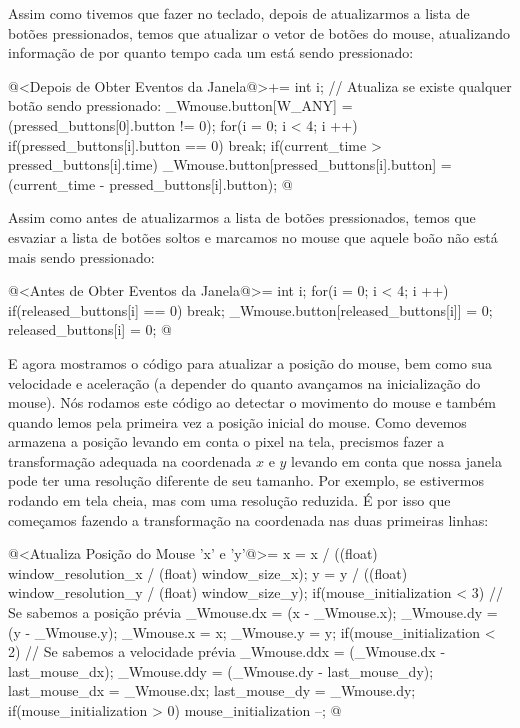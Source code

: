 Assim como tivemos que fazer no teclado, depois de atualizarmos a
lista de botões pressionados, temos que atualizar o vetor de botões do
mouse, atualizando informação de por quanto tempo cada um está sendo
pressionado:

\iniciocodigo
@<Depois de Obter Eventos da Janela@>+=
{
  int i;
  // Atualiza se existe qualquer botão sendo pressionado:
  _Wmouse.button[W_ANY] = (pressed_buttons[0].button != 0);
  for(i = 0; i < 4; i ++){
    if(pressed_buttons[i].button == 0)
      break;
    if(current_time > pressed_buttons[i].time)
      _Wmouse.button[pressed_buttons[i].button] =
        (current_time - pressed_buttons[i].button);
  }
}
@
\fimcodigo

Assim como antes de atualizarmos a lista de botões pressionados, temos
que esvaziar a lista de botões soltos e marcamos no mouse que aquele
boão não está mais sendo pressionado:

\iniciocodigo
@<Antes de Obter Eventos da Janela@>=
{
  int i;
  for(i = 0; i < 4; i ++){
    if(released_buttons[i] == 0)
      break;
    _Wmouse.button[released_buttons[i]] = 0;
    released_buttons[i] = 0;
  }
}
@
\fimcodigo

E agora mostramos o código para atualizar a posição do mouse, bem como
sua velocidade e aceleração (a depender do quanto avançamos na
inicialização do mouse). Nós rodamos este código ao detectar o
movimento do mouse e também quando lemos pela primeira vez a posição
inicial do mouse. Como devemos armazena a posição levando em conta o
pixel na tela, precismos fazer a transformação adequada na coordenada
$x$ e $y$ levando em conta que nossa janela pode ter uma resolução
diferente de seu tamanho. Por exemplo, se estivermos rodando em tela
cheia, mas com uma resolução reduzida. É por isso que começamos
fazendo a transformação na coordenada nas duas primeiras linhas:

\iniciocodigo
@<Atualiza Posição do Mouse 'x' e 'y'@>=
{
  x = x / ((float) window_resolution_x / (float) window_size_x);
  y = y / ((float) window_resolution_y / (float) window_size_y);
  if(mouse_initialization < 3){ // Se sabemos a posição prévia
    _Wmouse.dx = (x - _Wmouse.x);
    _Wmouse.dy = (y - _Wmouse.y);
  }
  _Wmouse.x = x;
  _Wmouse.y = y;
  if(mouse_initialization < 2){ // Se sabemos a velocidade prévia
    _Wmouse.ddx = (_Wmouse.dx - last_mouse_dx);
    _Wmouse.ddy = (_Wmouse.dy - last_mouse_dy);
  }
  last_mouse_dx = _Wmouse.dx;
  last_mouse_dy = _Wmouse.dy;
  if(mouse_initialization > 0)
    mouse_initialization --;
}
@
\fimcodigo

